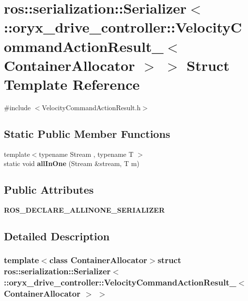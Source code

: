 \section{ros\-:\-:serialization\-:\-:\-Serializer$<$ \-:\-:oryx\-\_\-drive\-\_\-controller\-:\-:\-Velocity\-Command\-Action\-Result\-\_\-$<$ \-Container\-Allocator $>$ $>$ \-Struct \-Template \-Reference}
\label{structros_1_1serialization_1_1Serializer_3_01_1_1oryx__drive__controller_1_1VelocityCommandActioedd3380610b9165a628a9cefe175e681}


{\ttfamily \#include $<$\-Velocity\-Command\-Action\-Result.\-h$>$}

\subsection*{\-Static \-Public \-Member \-Functions}
\begin{DoxyCompactItemize}
\item 
{\footnotesize template$<$typename Stream , typename T $>$ }\\static void {\bf all\-In\-One} (\-Stream \&stream, \-T m)
\end{DoxyCompactItemize}
\subsection*{\-Public \-Attributes}
\begin{DoxyCompactItemize}
\item 
{\bf \-R\-O\-S\-\_\-\-D\-E\-C\-L\-A\-R\-E\-\_\-\-A\-L\-L\-I\-N\-O\-N\-E\-\_\-\-S\-E\-R\-I\-A\-L\-I\-Z\-E\-R}
\end{DoxyCompactItemize}


\subsection{\-Detailed \-Description}
\subsubsection*{template$<$class Container\-Allocator$>$struct ros\-::serialization\-::\-Serializer$<$ \-::oryx\-\_\-drive\-\_\-controller\-::\-Velocity\-Command\-Action\-Result\-\_\-$<$ Container\-Allocator $>$ $>$}



